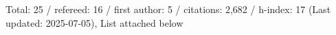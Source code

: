 Total: 25 / refereed: 16 / first author: 5 / citations: 2,682 / h-index: 17 (Last updated: 2025-07-05), List attached below